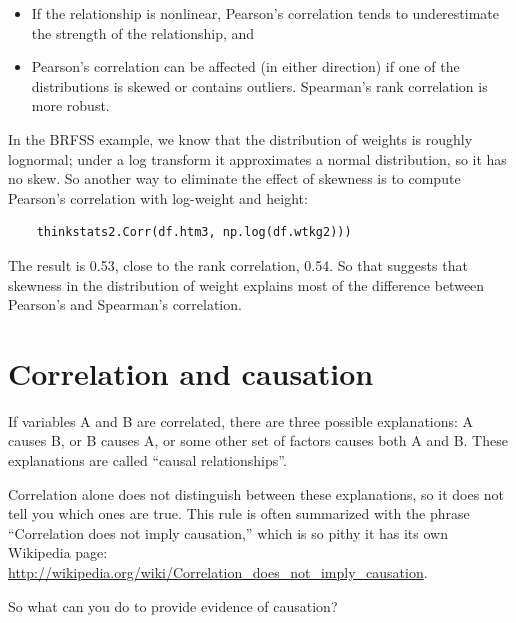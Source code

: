 \documentclass[12pt]{book}
\begin{document}
\begin{itemize}

\item If the relationship is
nonlinear, Pearson's correlation tends to underestimate the strength
of the relationship, and 

\item Pearson's correlation can be affected (in either direction)
if one of the distributions is skewed or contains outliers.  Spearman's
rank correlation is more robust.

\end{itemize}

In the BRFSS example, we know that the distribution of weights is
roughly lognormal; under a log transform it approximates a normal
distribution, so it has no skew.
So another way to eliminate the effect of skewness is to
compute Pearson's
correlation with log-weight and height:

\begin{verbatim}
    thinkstats2.Corr(df.htm3, np.log(df.wtkg2)))
\end{verbatim}

The result is 0.53, close to the rank correlation, 0.54.  So that
suggests that skewness in the distribution of weight explains most of
the difference between Pearson's and Spearman's correlation.


\section{Correlation and causation}

If variables A and B are correlated, there are three possible
explanations: A causes B, or B causes A, or some other set of factors
causes both A and B.  These explanations are called ``causal
relationships''.

Correlation alone does not distinguish between these explanations,
so it does not tell you which ones are true.
This rule is often summarized with the phrase ``Correlation
does not imply causation,'' which is so pithy it has its own
Wikipedia page: \url{http://wikipedia.org/wiki/Correlation_does_not_imply_causation}.

So what can you do to provide evidence of causation?
\end{document}
